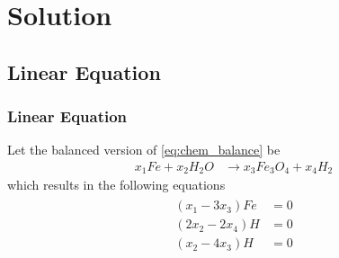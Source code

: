 \documentclass{beamer}
\providecommand{\brak}[1]{\ensuremath{\left(#1\right)}}
\theoremstyle{remark}
\providecommand{\norm}[1]{\lVert#1\rVert}
\newcommand{\myvec}[1]{\ensuremath{\begin{pmatrix}#1\end{pmatrix}}}
\let\vec\mathbf
\numberwithin{equation}{section}
\begin{document}
\section{Solution}
\subsection{Linear Equation}
\begin{frame}
\frametitle{Linear Equation}
Let the balanced version of \eqref{eq:chem_balance} be 
%
\begin{align}
\label{eq:chem_balance_unsol}
x_1Fe+x_2H_2 O &\rightarrow x_3Fe_3 O_4 + x_4H_2
\end{align}
%
which results in the following equations
%
\begin{align}
\begin{split}
\brak{x_1 -3x_3}Fe &= 0
\\
\brak{2x_2 -2x_4}H &= 0
\\
\brak{x_2 -4x_3}H &= 0
\end{split}
\end{align}
\end{frame}
\end{document}
